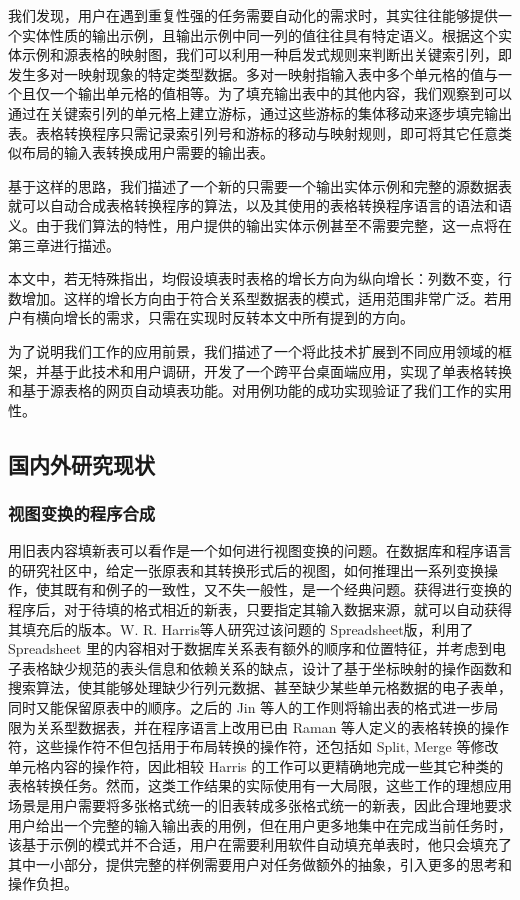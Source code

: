 \documentclass[design, pageheader]{njubachelor}
\begin{document}
我们发现，用户在遇到重复性强的任务需要自动化的需求时，其实往往能够提供一个实体性质的输出示例，且输出示例中同一列的值往往具有特定语义。根据这个实体示例和源表格的映射图，我们可以利用一种启发式规则来判断出关键索引列，即发生多对一映射现象的特定类型数据。多对一映射指输入表中多个单元格的值与一个且仅一个输出单元格的值相等。为了填充输出表中的其他内容，我们观察到可以通过在关键索引列的单元格上建立游标，通过这些游标的集体移动来逐步填完输出表。表格转换程序只需记录索引列号和游标的移动与映射规则，即可将其它任意类似布局的输入表转换成用户需要的输出表。

基于这样的思路，我们描述了一个新的只需要一个输出实体示例和完整的源数据表就可以自动合成表格转换程序的算法，以及其使用的表格转换程序语言的语法和语义。由于我们算法的特性，用户提供的输出实体示例甚至不需要完整，这一点将在第三章进行描述。

本文中，若无特殊指出，均假设填表时表格的增长方向为纵向增长：列数不变，行数增加。这样的增长方向由于符合关系型数据表的模式，适用范围非常广泛。若用户有横向增长的需求，只需在实现时反转本文中所有提到的方向。

为了说明我们工作的应用前景，我们描述了一个将此技术扩展到不同应用领域的框架，并基于此技术和用户调研，开发了一个跨平台桌面端应用，实现了单表格转换和基于源表格的网页自动填表功能。对用例功能的成功实现验证了我们工作的实用性。

\subsection{国内外研究现状}
\subsubsection{视图变换的程序合成}
用旧表内容填新表可以看作是一个如何进行视图变换的问题。在数据库和程序语言的研究社区中，给定一张原表和其转换形式后的视图，如何推理出一系列变换操作，使其既有和例子的一致性，又不失一般性，是一个经典问题\cite{sarma10}。获得进行变换的程序后，对于待填的格式相近的新表，只要指定其输入数据来源，就可以自动获得其填充后的版本。W. R. Harris等人研究过该问题的 Spreadsheet版\cite{harris11}，利用了 Spreadsheet 里的内容相对于数据库关系表有额外的顺序和位置特征，并考虑到电子表格缺少规范的表头信息和依赖关系的缺点，设计了基于坐标映射的操作函数和搜索算法，使其能够处理缺少行列元数据、甚至缺少某些单元格数据的电子表单，同时又能保留原表中的顺序。之后的 Jin 等人的工作则将输出表的格式进一步局限为关系型数据表\cite{jin17}，并在程序语言上改用已由 Raman 等人\cite{raman01}定义的表格转换的操作符，这些操作符不但包括用于布局转换的操作符，还包括如 Split, Merge 等修改单元格内容的操作符，因此相较 Harris 的工作可以更精确地完成一些其它种类的表格转换任务。然而，这类工作结果的实际使用有一大局限，这些工作的理想应用场景是用户需要将多张格式统一的旧表转成多张格式统一的新表，因此合理地要求用户给出一个完整的输入输出表的用例，但在用户更多地集中在完成当前任务时，该基于示例的模式并不合适，用户在需要利用软件自动填充单表时，他只会填充了其中一小部分，提供完整的样例需要用户对任务做额外的抽象，引入更多的思考和操作负担。
\end{document}
